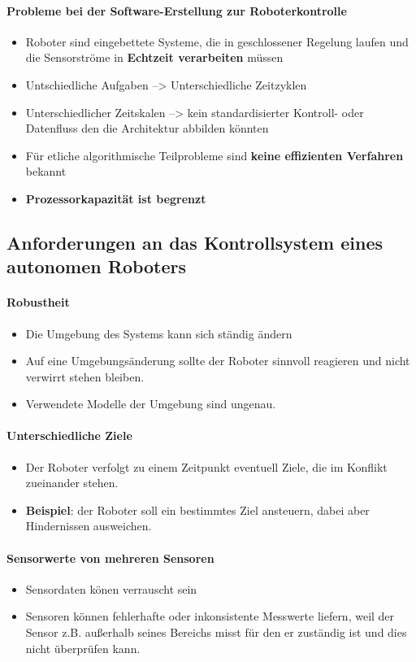 \paragraph{Probleme bei der Software-Erstellung zur Roboterkontrolle}
\begin{itemize}
	\item Roboter sind eingebettete Systeme, die in geschlossener Regelung laufen und die Sensorströme in \textbf{Echtzeit verarbeiten} müssen
	\item Untschiedliche Aufgaben --> Unterschiedliche Zeitzyklen
	\item Unterschiedlicher Zeitskalen --> kein standardisierter Kontroll- oder Datenfluss den die Architektur abbilden könnten
	\item Für etliche algorithmische Teilprobleme sind \textbf{keine effizienten Verfahren} bekannt
	\item \textbf{Prozessorkapazität ist begrenzt}
\end{itemize}
\subsection{Anforderungen an das Kontrollsystem eines autonomen Roboters}
\paragraph{Robustheit}
\begin{itemize}
	\item Die Umgebung des Systems kann sich ständig ändern
	\item Auf eine Umgebungsänderung sollte der Roboter sinnvoll reagieren und nicht verwirrt stehen bleiben.
	\item Verwendete Modelle der Umgebung sind ungenau.
\end{itemize}
\paragraph{Unterschiedliche Ziele}
\begin{itemize}
	\item Der Roboter verfolgt zu einem Zeitpunkt eventuell Ziele, die im Konflikt zueinander stehen.
	\item \textbf{Beispiel}: der Roboter soll ein bestimmtes Ziel ansteuern, dabei aber Hindernissen ausweichen.
\end{itemize}
\paragraph{Sensorwerte von mehreren Sensoren}
\begin{itemize}
	\item Sensordaten könen verrauscht sein
	\item Sensoren können fehlerhafte oder inkonsistente Messwerte liefern, weil der Sensor z.B. außerhalb seines Bereichs misst für den er zuständig ist und dies nicht überprüfen kann.
\end{itemize}
